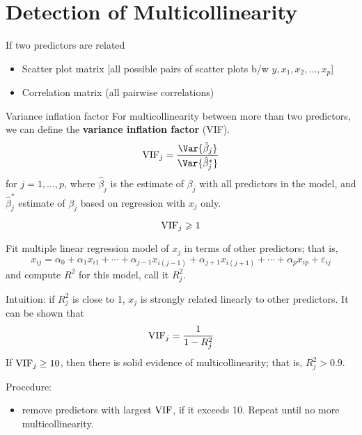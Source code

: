 \section{Detection of Multicollinearity}
If two predictors are related
\begin{itemize}
    \item Scatter plot matrix [all possible pairs of
                  scatter plots b/w $ y,x_1,x_2,\ldots,x_p $]
    \item Correlation matrix (all pairwise correlations)
\end{itemize}
\begin{Definition}{Variance inflation factor}{}
    For multicollinearity between more than two
    predictors, we can define the \textbf{variance inflation factor}
    (VIF).
    \[ \VIF_j=\frac{\Var{\hat{\beta}_j}}{\Var{\hat{\beta}_j^*}} \]
    for $ j=1,\ldots,p $,
    where $ \hat{\beta}_j $ is the estimate of $ \beta_j $ with all predictors
    in the model, and $ \hat{\beta}_j^* $ estimate
    of $ \beta_j $ based on regression with $ x_j $ only.
\end{Definition}
\begin{Theorem}{}{}
    \[ \operatorname{VIF}_j\geqslant 1 \]

\end{Theorem}
Fit multiple linear regression model of $ x_j $ in terms of other predictors;
that is,
\[ x_{i j}=\alpha_0+\alpha_1x_{i1}+\cdots+\alpha_{j-1}x_{i(j-1)}+
    \alpha_{j+1}x_{i(j+1)}+\cdots+\alpha_p x_{i p}+\varepsilon_{ij} \]
and compute $ R^2 $ for this model, call it $ R_j^2 $.

Intuition: if $ R_j^2 $ is close to 1, $ x_j $ is strongly
related linearly to other predictors. It can be shown that
\[ \operatorname{VIF}_j=\frac{1}{1-R_j^2}  \]
If $ \operatorname{VIF}_j\ge 10 $, then there is solid evidence of multicollinearity;
that is, $ R_j^2>0.9 $.

Procedure:
\begin{itemize}
    \item remove predictors with largest $ \operatorname{VIF} $, if it exceeds 10.
          Repeat until no more multicollinearity.
\end{itemize}

